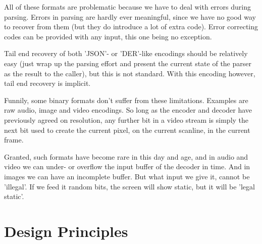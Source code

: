 All of these formats are problematic because we have to deal with
errors during parsing. Errors in parsing are hardly ever meaningful,
since we have no good way to recover from them (but they do introduce
a lot of extra code). Error correcting codes can be provided with any input,
this one being no exception.

Tail end recovery of both 'JSON'- or 'DER'-like encodings should be
relatively easy (just wrap up the parsing effort and present the current
state of the parser as the result to the caller), but this is not standard.
With this encoding however, tail end recovery is implicit.

Funnily, some binary formats don't suffer from these limitations.
Examples are raw audio, image and video encodings. So long as the
encoder and decoder have previously agreed on resolution,
any further bit in a video stream is simply the next bit used to
create the current pixel, on the current scanline, in the current frame.

Granted, such formats have become rare in this day and age,
and in audio and video we can under- or overflow the input buffer of the
decoder in time. And in images we can have an incomplete buffer.
But what input we give it, cannot be 'illegal'. If we feed
it random bits, the screen will show static, but it will be 'legal static'.

\section{Design Principles}
 
